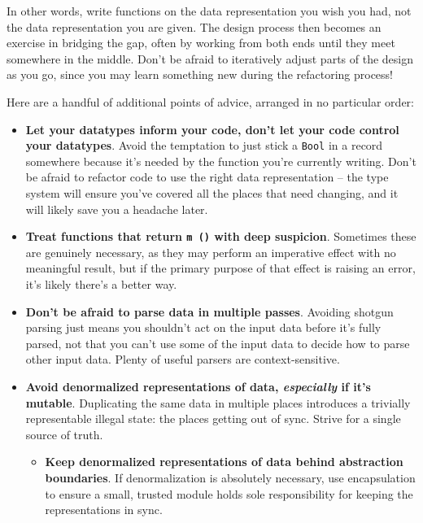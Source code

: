 In other words, write functions on the data representation you wish you had, not the data representation you are given. The design process then becomes an exercise in bridging the gap, often by working from both ends until they meet somewhere in the middle. Don't be afraid to iteratively adjust parts of the design as you go, since you may learn something new during the refactoring process!

Here are a handful of additional points of advice, arranged in no particular order:

\begin{itemize}
\item \textbf{Let your datatypes inform your code, don't let your code control your datatypes}. Avoid the temptation to just stick a \texttt{Bool} in a record somewhere because it's needed by the function you're currently writing. Don't be afraid to refactor code to use the right data representation -- the type system will ensure you've covered all the places that need changing, and it will likely save you a headache later.

\item \textbf{Treat functions that return \texttt{m ()} with deep suspicion}. Sometimes these are genuinely necessary, as they may perform an imperative effect with no meaningful result, but if the primary purpose of that effect is raising an error, it's likely there's a better way.

\item \textbf{Don't be afraid to parse data in multiple passes}. Avoiding shotgun parsing just means you shouldn't act on the input data before it's fully parsed, not that you can't use some of the input data to decide how to parse other input data. Plenty of useful parsers are context-sensitive.

\item \textbf{Avoid denormalized representations of data, \textit{especially} if it's mutable}. Duplicating the same data in multiple places introduces a trivially representable illegal state: the places getting out of sync. Strive for a single source of truth.

\begin{itemize}
\item \textbf{Keep denormalized representations of data behind abstraction boundaries}. If denormalization is absolutely necessary, use encapsulation to ensure a small, trusted module holds sole responsibility for keeping the representations in sync.
\end{itemize}


\end{itemize}
